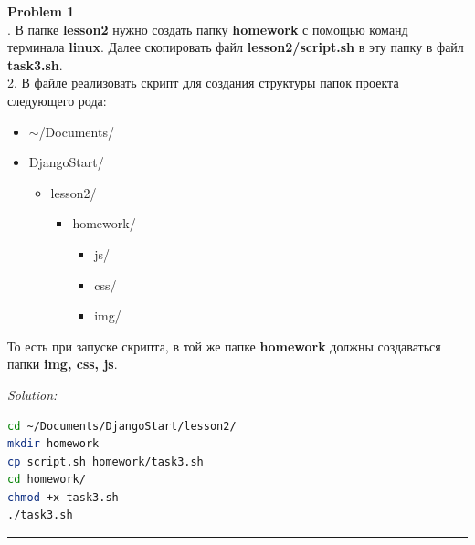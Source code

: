 \documentclass[a4paper, 11pt]{extarticle}
\newenvironment{problem}[2][Problem]
    { \begin{mdframed}[backgroundcolor=gray!20] \textbf{#1 #2} \\}
    {  \end{mdframed}}
\newenvironment{solution}
    {\textit{Solution:}}
    {}
\begin{document}
\begin{problem}{3}
1. В папке \textbf{lesson2} нужно создать папку \textbf{homework} с помощью команд терминала \textbf{linux}. Далее скопировать файл \textbf{lesson2/script.sh} в эту папку в файл \textbf{task3.sh}. \\
2. В файле реализовать скрипт для создания структуры папок проекта следующего рода:
\begin{itemize}
\item $\sim$/Documents/
\item DjangoStart/
\begin{itemize}
\item lesson2/
\begin{itemize}
\item homework/
\begin{itemize}
\item js/
\item css/
\item img/
\end{itemize}
\end{itemize}
\end{itemize}
\end{itemize}
То есть при запуске скрипта, в той же папке \textbf{homework} должны создаваться папки \textbf{img, css, js}.
\end{problem}
\begin{solution} 
\begin{lstlisting}[language=Bash]
cd ~/Documents/DjangoStart/lesson2/
mkdir homework
cp script.sh homework/task3.sh
cd homework/
chmod +x task3.sh
./task3.sh
\end{lstlisting}



\end{solution} 
\noindent\rule{6.257in}{2.8pt}
\end{document}
